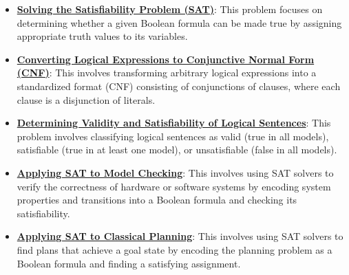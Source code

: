 \documentclass{article}%
\begin{document}
\begin{itemize}[leftmargin=*]%
\item \href{https://purdue.brightspace.com/d2l/common/assets/pdfjs-d2l-dist/1.0.14-legacy/web/viewer.html?file=%2Fcontent%2Fenforced%2F1095467-wl.202510.CS.24300.001%2F13L1-Logic.pdf%3Fou%3D1095467&lang=en-us&container=d2l-fileviewer-rendered-pdf&fullscreen=d2l-fileviewer-rendered-pdf-dialog&height=667#page=15}{\textbf{Solving the Satisfiability Problem (SAT)}}: This problem focuses on determining whether a given Boolean formula can be made true by assigning appropriate truth values to its variables.%
\item \href{https://purdue.brightspace.com/d2l/common/assets/pdfjs-d2l-dist/1.0.14-legacy/web/viewer.html?file=%2Fcontent%2Fenforced%2F1095467-wl.202510.CS.24300.001%2F13L1-Logic.pdf%3Fou%3D1095467&lang=en-us&container=d2l-fileviewer-rendered-pdf&fullscreen=d2l-fileviewer-rendered-pdf-dialog&height=667#page=16}{\textbf{Converting Logical Expressions to Conjunctive Normal Form (CNF)}}: This involves transforming arbitrary logical expressions into a standardized format (CNF) consisting of conjunctions of clauses, where each clause is a disjunction of literals.%
\item \href{https://purdue.brightspace.com/d2l/common/assets/pdfjs-d2l-dist/1.0.14-legacy/web/viewer.html?file=%2Fcontent%2Fenforced%2F1095467-wl.202510.CS.24300.001%2F13L1-Logic.pdf%3Fou%3D1095467&lang=en-us&container=d2l-fileviewer-rendered-pdf&fullscreen=d2l-fileviewer-rendered-pdf-dialog&height=667#page=13}{\textbf{Determining Validity and Satisfiability of Logical Sentences}}: This problem involves classifying logical sentences as valid (true in all models), satisfiable (true in at least one model), or unsatisfiable (false in all models).%
\item \href{https://purdue.brightspace.com/d2l/common/assets/pdfjs-d2l-dist/1.0.14-legacy/web/viewer.html?file=%2Fcontent%2Fenforced%2F1095467-wl.202510.CS.24300.001%2F13L1-Logic.pdf%3Fou%3D1095467&lang=en-us&container=d2l-fileviewer-rendered-pdf&fullscreen=d2l-fileviewer-rendered-pdf-dialog&height=667#page=20}{\textbf{Applying SAT to Model Checking}}: This involves using SAT solvers to verify the correctness of hardware or software systems by encoding system properties and transitions into a Boolean formula and checking its satisfiability.%
\item \href{https://purdue.brightspace.com/d2l/common/assets/pdfjs-d2l-dist/1.0.14-legacy/web/viewer.html?file=%2Fcontent%2Fenforced%2F1095467-wl.202510.CS.24300.001%2F13L1-Logic.pdf%3Fou%3D1095467&lang=en-us&container=d2l-fileviewer-rendered-pdf&fullscreen=d2l-fileviewer-rendered-pdf-dialog&height=667#page=21}{\textbf{Applying SAT to Classical Planning}}: This involves using SAT solvers to find plans that achieve a goal state by encoding the planning problem as a Boolean formula and finding a satisfying assignment.%

\end{itemize}
\end{document}
